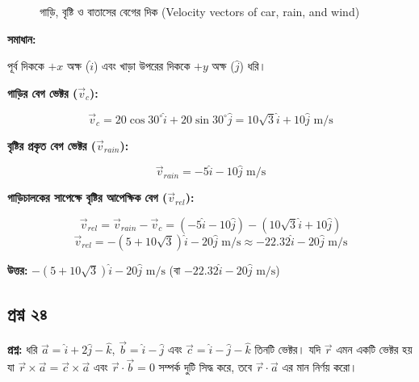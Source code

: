\documentclass{article}
\begin{document}
\begin{figure}[h!]
\centering
{}
\caption{গাড়ি, বৃষ্টি ও বাতাসের বেগের দিক (Velocity vectors of car, rain, and wind)}
\end{figure}

\textbf{সমাধান:}

পূর্ব দিককে $+x$ অক্ষ ($\hat{i}$) এবং খাড়া উপরের দিককে $+y$ অক্ষ ($\hat{j}$) ধরি।

\textbf{গাড়ির বেগ ভেক্টর ($\vec{v}_c$):}

$$\vec{v}_c = 20\cos 30^\circ\hat{i} + 20\sin 30^\circ\hat{j} = 10\sqrt{3}\hat{i} + 10\hat{j}\text{ m/s}$$

\textbf{বৃষ্টির প্রকৃত বেগ ভেক্টর ($\vec{v}_{rain}$):}

$$\vec{v}_{rain} = -5\hat{i} - 10\hat{j}\text{ m/s}$$

\textbf{গাড়িচালকের সাপেক্ষে বৃষ্টির আপেক্ষিক বেগ ($\vec{v}_{rel}$):}

$$\vec{v}_{rel} = \vec{v}_{rain} - \vec{v}_c = (-5\hat{i} - 10\hat{j}) - (10\sqrt{3}\hat{i} + 10\hat{j})$$
$$\vec{v}_{rel} = -(5 + 10\sqrt{3})\hat{i} - 20\hat{j}\text{ m/s} \approx -22.32\hat{i} - 20\hat{j}\text{ m/s}$$

\textbf{উত্তর:} $-(5 + 10\sqrt{3})\hat{i} - 20\hat{j}\text{ m/s}$ (বা $-22.32\hat{i} - 20\hat{j}\text{ m/s}$)

\hrulefill

\subsection*{প্রশ্ন ২৪}
\textbf{প্রশ্ন:} ধরি $\vec{a} = \hat{i} + 2\hat{j} - \hat{k}$, $\vec{b} = \hat{i} - \hat{j}$ এবং $\vec{c} = \hat{i} - \hat{j} - \hat{k}$ তিনটি ভেক্টর। যদি $\vec{r}$ এমন একটি ভেক্টর হয় যা $\vec{r} \times \vec{a} = \vec{c} \times \vec{a}$ এবং $\vec{r} \cdot \vec{b} = 0$ সম্পর্ক দুটি সিদ্ধ করে, তবে $\vec{r} \cdot \vec{a}$ এর মান নির্ণয় করো।
\end{document}
